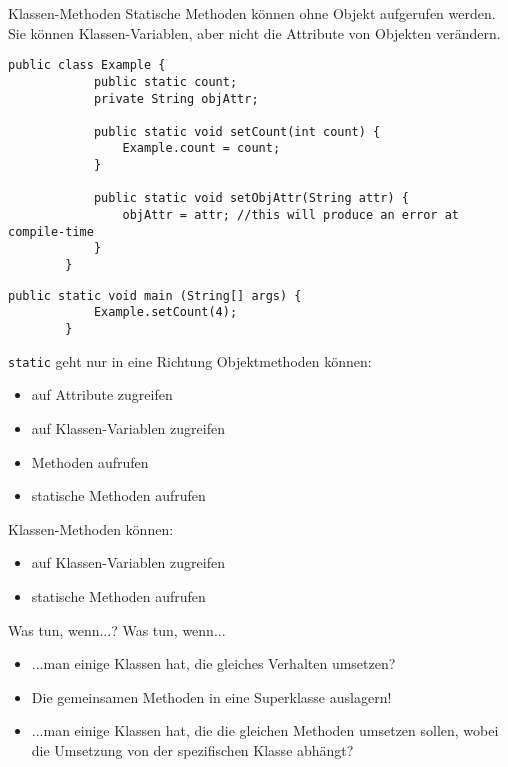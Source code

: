 \begin{frame}[fragile]{Klassen-Methoden}
    Statische Methoden können ohne Objekt aufgerufen werden.
    Sie können Klassen-Variablen, aber nicht die Attribute von Objekten verändern.
    \begin{lstlisting}[gobble=8]
        public class Example {
            public static count;
            private String objAttr;

            public static void setCount(int count) {
                Example.count = count;
            }

            public static void setObjAttr(String attr) {
                objAttr = attr; //this will produce an error at compile-time
            }
        }
	\end{lstlisting}
    \begin{lstlisting}[gobble=8]
        public static void main (String[] args) {
            Example.setCount(4);
        }
	\end{lstlisting}
\end{frame}

\begin{frame}[fragile]{\texttt{static} geht nur in eine Richtung}
    Objektmethoden können:
    \begin{itemize}[<+->]
		\item auf Attribute zugreifen
		\item auf Klassen-Variablen zugreifen
		\item Methoden aufrufen
		\item statische Methoden aufrufen
	\end{itemize}
    Klassen-Methoden können:
    \begin{itemize}[<+->]
		\item auf Klassen-Variablen zugreifen
		\item statische Methoden aufrufen
	\end{itemize}
\end{frame}

\begin{frame}{Was tun, wenn...?}
    Was tun, wenn...
    \begin{itemize}[<+->]
        \item ...man einige Klassen hat, die gleiches Verhalten umsetzen? \\
        \item [] \indent Die gemeinsamen Methoden in eine Superklasse auslagern!
        \item ...man einige Klassen hat, die die gleichen Methoden umsetzen sollen, wobei die Umsetzung von der spezifischen Klasse abhängt?
    \end{itemize}
\end{frame}

